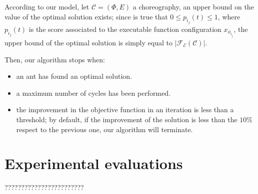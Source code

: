 \documentclass[12pt,a4paper]{report}
\begin{document}
According to our model, let $\mathcal{C} = (\Phi,E)$ a choreography, an upper bound on the value of the optimal solution exists; since is true that $0 \leq p_{i_j}(t) \leq 1$, where $p_{i_j}(t)$ is the score associated to the executable function configuration $x_{\phi_{i_j}}$, the upper bound of the optimal solution is simply equal to $|\mathscr{F_E}(\mathcal{C})|$.

Then, our algorithm stops when:

\begin{itemize}
	\item an ant has found an optimal solution.
	\item a maximum number of cycles has been performed.
	\item the improvement in the objective function in an iteration is less than a threshold; by default, if the improvement of the solution is less than the $10\%$ respect to the previous one, our algorithm will terminate.
\end{itemize}


\newpage




\chapter{Experimental evaluations}

????????????????????????



\end{document}
